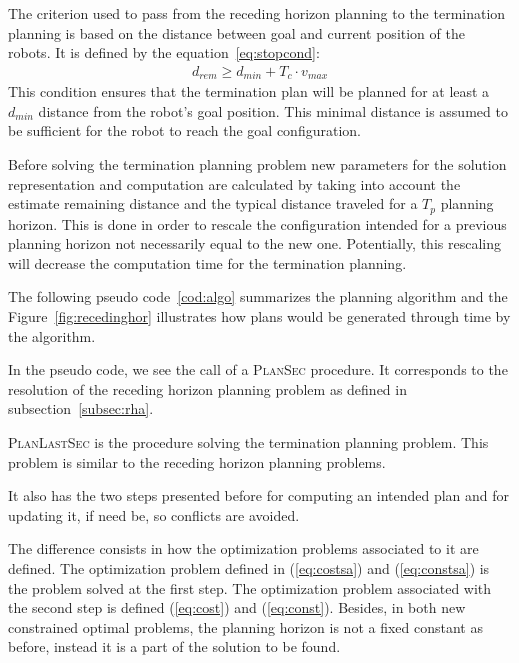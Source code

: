 \documentclass[eprint]{actapoly}
\begin{document}
The criterion used to pass from the receding 
horizon planning to the termination planning is based on the distance between
goal and current position of the robots. It is defined by the equation~\ref{eq:stopcond}:
\begin{align}\label{eq:stopcond}
  d_{rem} \geq d_{min} + T_c \cdot v_{max}
\end{align}
This condition ensures that the termination plan will be planned for at least a 
$d_{min}$ distance from the robot's goal position.
This minimal distance is assumed to be sufficient for the robot to reach the 
goal configuration.

Before solving the termination planning problem new parameters for 
the solution representation and computation are calculated by taking into
account the estimate remaining distance and the typical distance traveled
for a $T_p$ planning horizon.
This is done in order to rescale the configuration intended for a previous 
planning horizon not necessarily equal to the new one. Potentially, this
rescaling will decrease the computation time for the termination planning.

The following pseudo code~\ref{cod:algo} summarizes the planning algorithm    
and the Figure~\ref{fig:recedinghor} illustrates how plans would be generated
through time by the algorithm.

In the pseudo code, we see the call of a {\scshape PlanSec} procedure.
It corresponds to the resolution of the receding horizon planning 
problem as defined in subsection~\ref{subsec:rha}.

{\scshape PlanLastSec} is the procedure solving the termination planning
problem. This problem is similar to the receding horizon planning problems.


It also has the two steps presented before for computing an intended plan and
for updating it, if need be, so conflicts are avoided.


The difference consists in how the optimization problems associated to it are 
defined. The optimization problem defined in (\ref{eq:costsa}) and
(\ref{eq:constsa}) is the problem solved at the first step.
The optimization
problem associated with the second step is defined (\ref{eq:cost}) and (\ref{eq:const}).
Besides, in both new constrained optimal problems, the planning horizon is not
a fixed constant as before, instead it is a part of the solution to be found.
\end{document}
